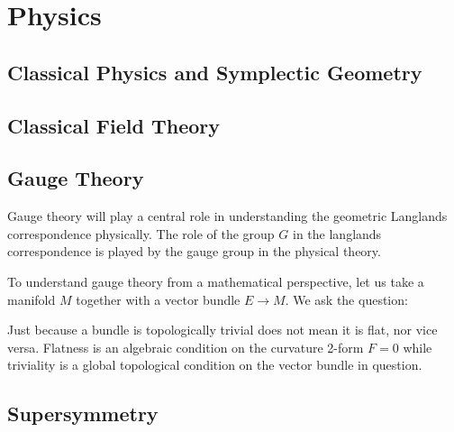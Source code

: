 \chapter{Physics\label{ch:phys}}

	
	\section{Classical Physics and Symplectic Geometry} %
	\label{sec:classical_physics_and_symplectic_geometry}
	
	
	\section{Classical Field Theory} %
	\label{sec:classical_field_theory}
	
	
	\section{Gauge Theory} %
	\label{sec:gauge_theory}
	
	Gauge theory will play a central role in understanding the geometric Langlands correspondence physically. The role of the group $G$ in the langlands correspondence is played by the gauge group in the physical theory. 
	
	To understand gauge theory from a mathematical perspective, let us take a manifold $M$ together with a vector bundle $E \to M$. We ask the question:
	\begin{ques}
		
	\end{ques}
	
	\begin{nb}
		Just because a bundle is topologically trivial does not mean it is flat, nor vice versa. Flatness is an algebraic condition on the curvature 2-form $F = 0$ while triviality is a global topological condition on the vector bundle in question. 
	\end{nb}
	
	
	\section{Supersymmetry} %
	\label{sec:supersymmetry}
	
